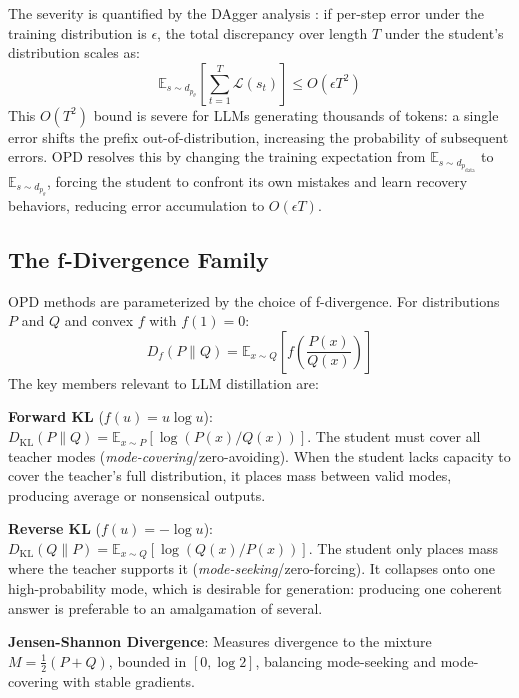 \documentclass{article} %
\newcommand{\ptheta}{p_\theta}
\newcommand{\pdata}{p_{\mathrm{data}}}
\newcommand{\loss}{\mathcal{L}}
\begin{document}
The severity is quantified by the DAgger analysis \citep{ross2011reduction}: if per-step error under the training distribution is $\epsilon$, the total discrepancy over length $T$ under the student's distribution scales as:
\begin{equation}
    \mathbb{E}_{s \sim d_{\ptheta}} \left[ \sum_{t=1}^T \loss(s_t) \right] \le O(\epsilon T^2)
\end{equation}
This $O(T^2)$ bound is severe for LLMs generating thousands of tokens: a single error shifts the prefix out-of-distribution, increasing the probability of subsequent errors. OPD resolves this by changing the training expectation from $\mathbb{E}_{s \sim d_{\pdata}}$ to $\mathbb{E}_{s \sim d_{\ptheta}}$, forcing the student to confront its own mistakes and learn recovery behaviors, reducing error accumulation to $O(\epsilon T)$.

\subsection{The f-Divergence Family}
\label{subsec:f_divergence}

OPD methods are parameterized by the choice of f-divergence. For distributions $P$ and $Q$ and convex $f$ with $f(1)=0$:
\begin{equation}
    D_f(P \parallel Q) = \mathbb{E}_{x \sim Q} \left[ f\left(\frac{P(x)}{Q(x)}\right) \right]
\end{equation}
The key members relevant to LLM distillation are:

\textbf{Forward KL} ($f(u) = u \log u$): $D_{\mathrm{KL}}(P \parallel Q) = \mathbb{E}_{x \sim P}[\log(P(x)/Q(x))]$. The student must cover all teacher modes (\textit{mode-covering}/zero-avoiding). When the student lacks capacity to cover the teacher's full distribution, it places mass between valid modes, producing average or nonsensical outputs.

\textbf{Reverse KL} ($f(u) = -\log u$): $D_{\mathrm{KL}}(Q \parallel P) = \mathbb{E}_{x \sim Q}[\log(Q(x)/P(x))]$. The student only places mass where the teacher supports it (\textit{mode-seeking}/zero-forcing). It collapses onto one high-probability mode, which is desirable for generation: producing one coherent answer is preferable to an amalgamation of several.

\textbf{Jensen-Shannon Divergence}: Measures divergence to the mixture $M = \frac{1}{2}(P+Q)$, bounded in $[0, \log 2]$, balancing mode-seeking and mode-covering with stable gradients.
\end{document}
